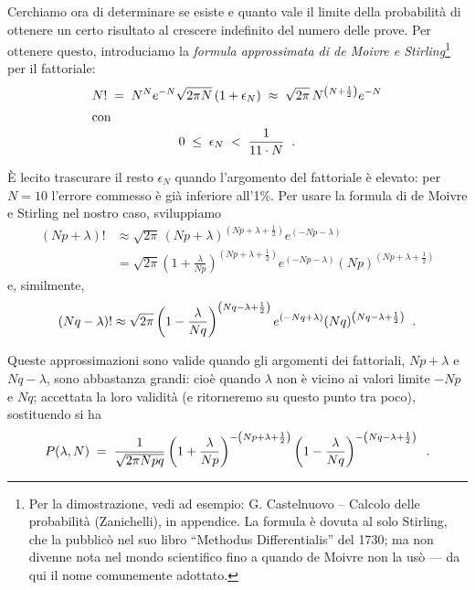 Cerchiamo ora di determinare se esiste e quanto vale il
limite della probabilit\`a di ottenere un certo risultato al
crescere indefinito del numero delle prove.  Per ottenere
questo, introduciamo la \emph{formula approssimata di de
  Moivre e Stirling}\thinspace\footnote{Per la
  dimostrazione, vedi ad esempio: G. Castelnuovo -- Calcolo
  delle probabilit\`a (Zanichelli), in appendice.  La
  formula \`e dovuta al solo Stirling,%
  che la pubblic\`o nel suo libro ``Methodus
  Differentialis'' del 1730; ma non divenne nota nel mondo
  scientifico fino a quando de Moivre%
  non la us\`o --- da qui il nome comunemente adottato.}
per il fattoriale:
\begin{gather*}%
  \index{de Moivre!e Stirling, formula di}
  N! \; = \; N^N e^{-N} \sqrt{2 \pi N} \, ( 1 +
    \epsilon_N ) \; \approx \; \sqrt{ 2 \pi} \,
    N^{\left( N+\frac{1}{2} \right)} e^{-N} \\
  \intertext{con}
  0 \; \le \; \epsilon_N \; < \; \frac{1}{11 \cdot N} \peq .
\end{gather*}

\`E lecito trascurare il resto $\epsilon_N$ quando
l'argomento del fattoriale \`e elevato: per $N=10$ l'errore
commesso \`e gi\`a inferiore all'1\%.  Per usare la formula
di de Moivre e Stirling nel nostro caso, sviluppiamo
\begin{align*}
  (Np+\lambda)! &\approx \sqrt{2 \pi}
    \, (Np+\lambda)^{\left( Np+\lambda + \frac{1}{2}
    \right)} e^{\left( -Np -\lambda \right)} \\[1ex]
  &= \sqrt{2 \pi}
    \left( 1 + \frac{\lambda}{Np} \right) ^{\left( Np
    +\lambda +\frac{1}{2} \right)} e^{\left( -Np -
    \lambda \right)} (Np)^{\left( Np +\lambda
    +\frac{1}{2} \right)}
\end{align*}
e, similmente,
\begin{equation*}
  (Nq-\lambda)! \approx \sqrt{2 \pi}
    \left( 1 - \frac{\lambda}{Nq} \right)
    ^{\left( Nq -\lambda +\frac{1}{2} \right)}
    e^{\left( -Nq +\lambda \right)}
    (Nq)^{\left( Nq -\lambda +\frac{1}{2} \right)} \;\; .
\end{equation*}

Queste approssimazioni sono valide quando gli argomenti dei
fattoriali, $Np + \lambda$ e $Nq - \lambda$, sono abbastanza
grandi: cio\`e quando $\lambda$ non \`e vicino ai valori
limite $-Np$ e $Nq$; accettata la loro validit\`a (e
ritorneremo su questo punto tra poco), sostituendo si ha
\begin{equation*}
  P(\lambda, N) \; = \; \frac{1}{\sqrt{ 2 \pi N p q }}
    \left( 1 + \frac{\lambda}{Np} \right)
    ^{- \left( Np +\lambda +\frac{1}{2}
    \right)} \left( 1 - \frac{\lambda}{Nq} \right)
    ^{ - \left( Nq -\lambda +\frac{1}{2} \right)} \;\; .
\end{equation*}

